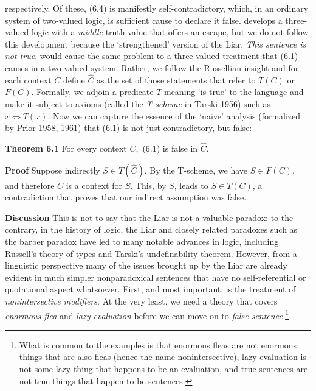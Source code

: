 \noindent respectively. Of these, (6.4) is manifestly self-contradictory,
which, in an ordinary system of two-valued logic, is sufficient cause to
declare it false.  develops a three-valued logic with a
{\it middle} truth value that offers an escape, but we do not follow this
development because the `strengthened' version of the Liar, {\it This
  sentence is not true}, would cause the same problem to a three-valued
treatment that (6.1) causes in a two-valued system. Rather, we follow the
Russellian insight and for each context $C$ define $\widehat{C}$ as the set of
those statements that refer to $T(C)$ or $F(C)$. Formally, we adjoin a
predicate $T$ meaning `is true' to the language and make it subject to axioms
(called the {\it T-scheme} in Tarski 1956)\nocite{Tarski:1956} such as $x
\Leftrightarrow T(x)$. Now we can
capture the essence of the `naive' analysis (formalized by Prior 1958, 1961)
that (6.1) is not just contradictory, but
false:\nocite{Prior:1958}\nocite{Prior:1961}

\medskip
\noindent
{\bf Theorem 6.1} For every context $C,$ (6.1) is false in $\widehat{C}$.

\medskip
\noindent
{\bf Proof} Suppose indirectly $ S \in T(\widehat{C})$. By the T-scheme,
we have $S \in F(C)$, and therefore $C$ is a context for $S$. This,
by $S$, leads to $S \in T(C)$, a contradiction that proves that our 
indirect assumption was false. 

\medskip
\noindent
{\bf Discussion} This is not to say that the Liar is not a valuable paradox:
to the contrary, in
the history of logic, the Liar and closely related paradoxes such as the
barber paradox have led to many notable advances in logic, including Russell's
theory of types and Tarski's undefinability theorem. However, from a
linguistic perspective many of the issues brought up by the Liar are already
evident in much simpler nonparadoxical sentences that have no
self-referential or quotational aspect whatsoever. First, and most important,
is the treatment of {\it nonintersective modifiers}. At the very least, we need a theory that covers {\it enormous flea}
\cite{Parsons:1970} and {\it lazy evaluation} before we can move on to {\it
  false sentence.}\footnote{What is common to the examples is that enormous
  fleas are not enormous things that are also fleas (hence the name
  nonintersective), lazy evaluation is not some lazy thing that happens to be
  an evaluation, and true sentences are not true things that happen to be
  sentences.}

